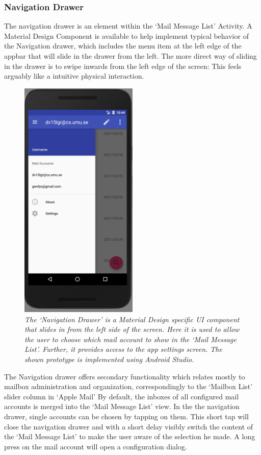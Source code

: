 \documentclass[a4paper,11pt,twoside]{article}
\begin{document}
\subsubsection{Navigation Drawer}
The navigation drawer is an element within the `Mail Message List' Activity. A
Material Design Component is available to help implement typical behavior of
the Navigation drawer, which includes the menu item at the left edge of the appbar
that will slide in the drawer from the left. The more direct way of
sliding in the drawer is to swipe inwards from the left edge of the screen: This
feels arguably like a intuitive physical interaction.

\begin{figure}[hp!]
  \label{fig:nav_drawer}
  \centering
    \includegraphics[width=0.5\textwidth]{nav_drawer}
    \caption{\textit{The `Navigation Drawer' is a Material Design specific
    UI component that slides in from the left side of the screen. Here it
    is used to allow the user to choose which mail account to show in the
    `Mail Message List'. Further, it provides access to the app settings
    screen. The shown prototype is implemented using Android Studio.}}
\end{figure}

The Navigation drawer offers secondary functionality which relates mostly to
mailbox administration and organization, correspondingly to the `Mailbox List'
slider column in `Apple Mail'  By default, the inboxes of
all configured mail accounts is merged into the `Mail Message List' view. In the
the navigation drawer, single accounts can be chosen by tapping on them. This
short tap will close the navigation drawer and with a short delay visibly switch
the content of the `Mail Message List' to make the user aware of the selection
he made. A long press on the mail account will open a configuration dialog.
\end{document}
